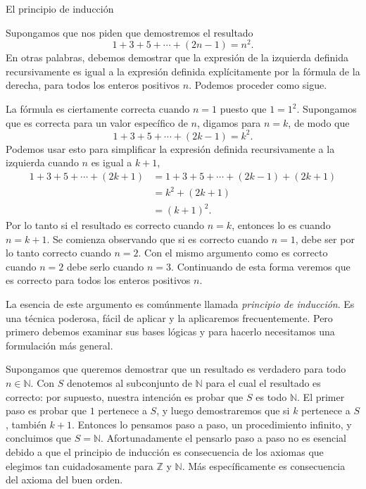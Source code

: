 \begin{section}{El principio de inducción}\label{seccion-principio-de-induccion}

Supongamos que nos piden que demostremos el resultado
$$
1+3+5+\cdots+(2n-1) = n^2.
$$
En otras palabras, debemos demostrar que la expresión de la izquierda definida recursivamente es igual a la expresión definida explícitamente por la fórmula de la derecha, para todos los enteros positivos $n$. Podemos proceder como sigue.

La fórmula es ciertamente correcta cuando $n=1$ puesto que $1=1^2$.  Supongamos que es correcta para un valor específico de $n$, digamos para $n=k$, de modo que
$$
1+3+5+\cdots+(2k-1) = k^2.
$$
Podemos usar esto para simplificar la expresión definida recursivamente a la izquierda cuando $n$ es igual a $k+1$,
$$
\begin{aligned}
1+3+5+\cdots+(2k+1) &= 1+3+5+\cdots+(2k-1) +(2k+1) \\
&=k^2 +(2k+1) \\
&=(k+1)^2.
\end{aligned}
$$
Por lo tanto si el resultado es correcto cuando $n=k$, entonces lo es cuando $n=k+1$. Se comienza observando que si es correcto cuando $n=1$, debe ser por lo tanto correcto cuando $n=2$. Con el mismo argumento como es correcto cuando $n=2$ debe serlo cuando $n=3$. Continuando de esta forma veremos que es correcto para todos los enteros positivos $n$.

La esencia de este argumento es comúnmente llamada \textit{principio de inducción}. Es una técnica poderosa, fácil de aplicar y la aplicaremos frecuentemente. Pero primero debemos examinar sus bases lógicas y para hacerlo necesitamos una formulación más general. 

Supongamos que queremos demostrar que un resultado es verdadero para todo $n \in \mathbb N$. Con $S$ denotemos al subconjunto de $\mathbb N$ para el cual el resultado es correcto: por supuesto, nuestra intención es probar que $S$ es todo $\mathbb N$. El primer paso es probar que $1$ pertenece a $S$, y luego demostraremos que si $k$ pertenece a $S$, también $k+1$. Entonces lo pensamos paso a paso, un procedimiento infinito, y concluimos que $S=\mathbb N$. Afortunadamente el pensarlo paso a paso no es esencial debido a que el principio de inducción es consecuencia de los axiomas que elegimos tan cuidadosamente para $\mathbb Z$ y $\mathbb N$. Más específicamente es consecuencia del axioma del buen orden.


\end{section}
